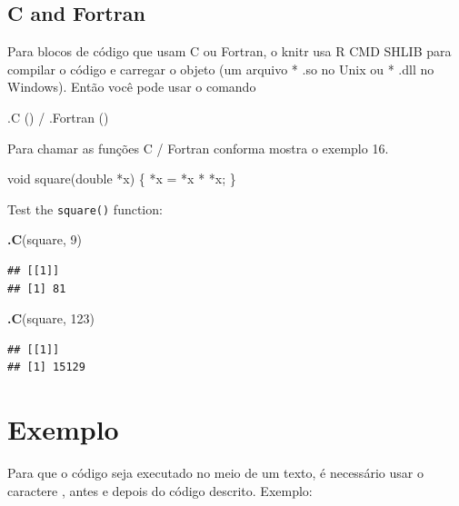 \documentclass[
]{book}
\newenvironment{Shaded}{\begin{snugshade}}{\end{snugshade}}
\newcommand{\DataTypeTok}[1]{\textcolor[rgb]{0.13,0.29,0.53}{#1}}
\newcommand{\DecValTok}[1]{\textcolor[rgb]{0.00,0.00,0.81}{#1}}
\newcommand{\KeywordTok}[1]{\textcolor[rgb]{0.13,0.29,0.53}{\textbf{#1}}}
\newcommand{\NormalTok}[1]{#1}
\newcommand{\StringTok}[1]{\textcolor[rgb]{0.31,0.60,0.02}{#1}}
\begin{document}
\hypertarget{c-and-fortran}{%
\subsection{C and Fortran}\label{c-and-fortran}}

Para blocos de código que usam C ou Fortran, o knitr usa R CMD SHLIB para compilar o código e carregar o objeto (um arquivo * .so no Unix ou * .dll no Windows). Então você pode usar o comando

.C () / .Fortran ()

Para chamar as funções C / Fortran conforma mostra o exemplo 16.

\begin{Shaded}
\begin{Highlighting}[]
\DataTypeTok{void}\NormalTok{ square(}\DataTypeTok{double}\NormalTok{ *x) \{}
\NormalTok{*x = *x * *x;}
\NormalTok{\}}
\end{Highlighting}
\end{Shaded}

Test the \texttt{square()} function:

\begin{Shaded}
\begin{Highlighting}[]
\KeywordTok{.C}\NormalTok{(}\StringTok{\textquotesingle{}square\textquotesingle{}}\NormalTok{, }\DecValTok{9}\NormalTok{)}
\end{Highlighting}
\end{Shaded}

\begin{verbatim}
## [[1]]
## [1] 81
\end{verbatim}

\begin{Shaded}
\begin{Highlighting}[]
\KeywordTok{.C}\NormalTok{(}\StringTok{\textquotesingle{}square\textquotesingle{}}\NormalTok{, }\DecValTok{123}\NormalTok{)}
\end{Highlighting}
\end{Shaded}

\begin{verbatim}
## [[1]]
## [1] 15129
\end{verbatim}

\hypertarget{exemplo}{%
\section{Exemplo}\label{exemplo}}

Para que o código seja executado no meio de um texto, é necessário usar o caractere \texttt{\textasciigrave{}}, antes e depois do código descrito. Exemplo:
\end{document}
